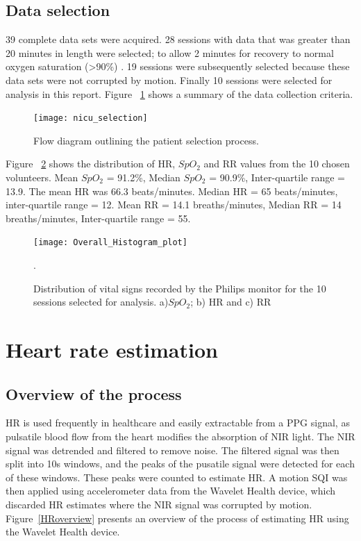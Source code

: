 \subsection{Data selection}
39 complete data sets were acquired. 28 sessions with data that was greater than 20 minutes in length were selected; to allow 2 minutes for recovery to normal oxygen saturation (>90\%) . 19 sessions were subsequently selected because these data sets were not corrupted by motion. Finally 10 sessions were selected for analysis in this report. Figure ~\ref{selection} shows a summary of the data collection criteria.

\begin{figure}
    \centering
\texttt{[image: nicu\_selection]}
    \caption{Flow diagram outlining the patient selection process.}
    \label{selection} 
\end{figure}

Figure ~\ref{vs hist} shows the distribution of HR, $SpO_{2}$  and RR values from the 10 chosen volunteers. Mean $SpO_{2}$  = 91.2\%, Median $SpO_{2}$ = 90.9\%, Inter-quartile range = 13.9. The mean HR was 66.3 beats/minutes. Median HR = 65 beats/minutes, inter-quartile range = 12. Mean RR = 14.1 breaths/minutes, Median RR = 14 breaths/minutes, Inter-quartile range = 55.

\begin{figure}
    \centering
\texttt{[image: Overall\_Histogram\_plot]}
    \caption [Distribution of vital signs recorded by the Philips monitor for the 10 sessions selected for analysis.]{Distribution of vital signs recorded by the Philips monitor for the 10 sessions selected for analysis. a)$SpO_{2}$; b) HR and c) RR}. 
    \label{vs hist} 
\end{figure}

\section{Heart rate estimation}
\label{HR est_wav}


\subsection{Overview of the process}

HR is used frequently in healthcare and easily extractable from a PPG signal, as pulsatile blood flow from the heart modifies the absorption of NIR light. The NIR signal was detrended and filtered to remove noise. The filtered signal was then split into 10s windows, and the peaks of the pusatile signal were detected for each of these windows. These peaks were counted to estimate HR. A motion SQI was then applied using accelerometer data from the Wavelet Health device, which discarded HR estimates where the NIR signal was corrupted by motion. Figure~\ref{HRoverview} presents an overview of the process of estimating HR using the Wavelet Health device. 

